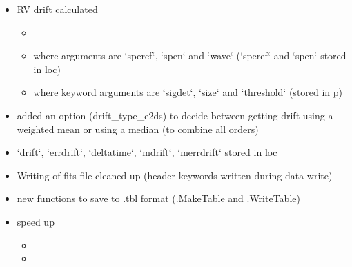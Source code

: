 \begin{itemize}
\item RV drift calculated
	\begin{itemize}
	\item {}
	\item where arguments are `speref`, `spen` and `wave` (`speref` and `spen` stored in loc)
	\item where keyword arguments are `sigdet`, `size` and `threshold` (stored in p)
	\end{itemize}

\item added an option (drift\_type\_e2ds) to decide between getting drift using a weighted mean or using a median (to combine all orders)

\item `drift`, `errdrift`, `deltatime`, `mdrift`, `merrdrift` stored in loc

\item Writing of fits file cleaned up (header keywords written during data write)

\item new functions to save to .tbl format (\spirouImage.MakeTable and \spirouImage.WriteTable)

\item speed up
	\begin{itemize}
	\item 
	\item 
	\end{itemize}

\end{itemize}